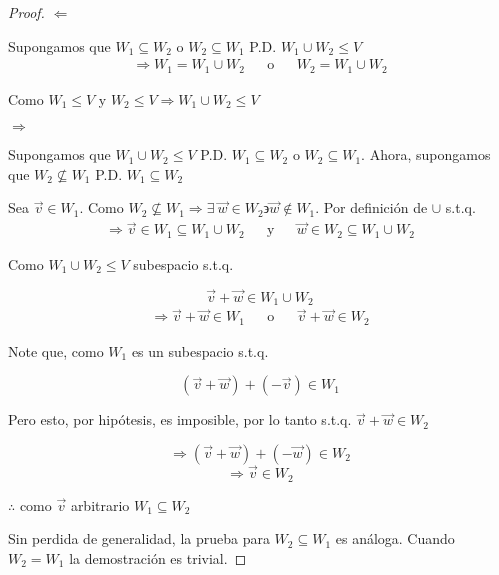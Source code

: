 \begin{proof}

    $\Leftarrow$ 
    
    Supongamos que $W_1 \subseteq W_2$ o $W_2 \subseteq W_1$ P.D. $W_1 \cup W_2 \leq V$
    \begin{align*}
          \Rightarrow  W_1 = W_1 \cup W_2   & & \text{o} & &  W_2 = W_1 \cup W_2 
    \end{align*}

    Como $W_1 \leq V$ y $W_2 \leq V \Rightarrow W_1 \cup W_2 \leq V$

    $\Rightarrow$ 
    
    Supongamos que $W_1 \cup W_2 \leq V$ P.D.  $W_1 \subseteq W_2$ o $W_2 \subseteq W_1$. Ahora, supongamos que $W_2 \nsubseteq W_1$ P.D. $W_1 \subseteq W_2$ 
    
    Sea $\vec{v} \in W_1$. Como  $W_2 \nsubseteq W_1 \Rightarrow \exists \: \vec{w} \in W_2 \backepsilon \vec{w} \notin W_1 $. Por definición de $\cup$ s.t.q.
    \begin{align*}
          \Rightarrow  \vec{v} \in W_1 \subseteq  W_1 \cup W_2  & & \text{y} & &  \vec{w} \in W_2 \subseteq  W_1 \cup W_2 
    \end{align*}

    Como $W_1 \cup W_2  \leq V$ subespacio s.t.q.


    \begin{equation*}
        \vec{v} + \vec{w} \in W_1 \cup W_2
    \end{equation*}
    \begin{align*}
          \Rightarrow  \vec{v} + \vec{w} \in W_1  & & \text{o} & &  \vec{v} + \vec{w} \in W_2
    \end{align*}

    Note que, como $W_1$ es un subespacio s.t.q.

    \begin{equation*}
        (\vec{v} + \vec{w}) + (-\vec{v} ) \in W_1
    \end{equation*}

    Pero esto, por hipótesis, es imposible, por lo tanto s.t.q. $\vec{v} + \vec{w} \in W_2$

    \begin{equation*}
        \Rightarrow (\vec{v} + \vec{w}) + (-\vec{w} )  \in W_2
    \end{equation*}
    \begin{equation*}
        \Rightarrow \vec{v} \in W_2
    \end{equation*}

    $\therefore $ como $\vec{v}$ arbitrario $W_1 \subseteq W_2$

    Sin perdida de generalidad, la prueba para $W_2 \subseteq W_1$ es análoga. Cuando $W_2 = W_1$  la demostración es trivial.
\end{proof}

